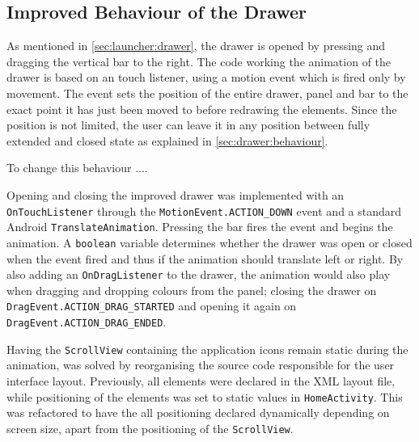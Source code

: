 \subsection{Improved Behaviour of the Drawer}
As mentioned in \cref{sec:launcher:drawer}, the drawer is opened by pressing and dragging the vertical bar to the right.
The code working the animation of the drawer is based on an touch listener, using a motion event which is fired only by movement.
The event sets the position of the entire drawer, panel and bar to the exact point it has just been moved to before redrawing the elements.
Since the position is not limited, the user can leave it in any position between fully extended and closed state as explained in \cref{sec:drawer:behaviour}.

To change this behaviour .... 

Opening and closing the improved drawer was implemented with an \lstinline{OnTouchListener} through the \lstinline{MotionEvent.ACTION_DOWN} event and a standard Android \lstinline{TranslateAnimation}.
Pressing the bar fires the event and begins the animation.
A \lstinline{boolean} variable determines whether the drawer was open or closed when the event fired and thus if the animation should translate left or right.
By also adding an \lstinline{OnDragListener} to the drawer, the animation would also play when dragging and dropping colours from the panel; closing the drawer on \lstinline{DragEvent.ACTION_DRAG_STARTED} and opening it again on \lstinline{DragEvent.ACTION_DRAG_ENDED}.

Having the \lstinline{ScrollView} containing the application icons remain static during the animation, was solved by reorganising the source code responsible for the user interface layout. 
Previously, all elements were declared in the XML layout file, while positioning of the elements was set to static values in \lstinline{HomeActivity}.
This was refactored to have the all positioning declared dynamically depending on screen size, apart from the positioning of the \lstinline{ScrollView}.